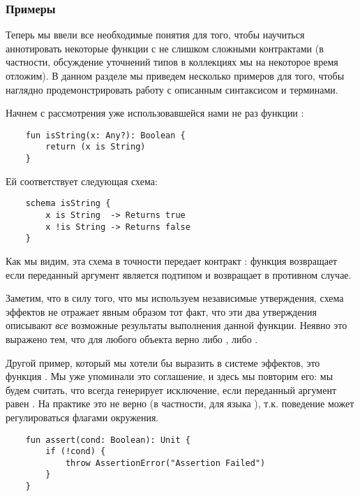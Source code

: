 \subsubsection{Примеры}

Теперь мы ввели все необходимые понятия для того, чтобы научиться аннотировать некоторые функции с не слишком сложными контрактами (в частности, обсуждение уточнений типов в коллекциях мы на некоторое время отложим). В данном разделе мы приведем несколько примеров для того, чтобы наглядно продемонстрировать работу с описанным синтаксисом и терминами.

Начнем с рассмотрения уже использовавшейся нами не раз функции :

\begin{verbatim}
    fun isString(x: Any?): Boolean {
        return (x is String)
    }
\end{verbatim}

Ей соответствует следующая схема:

\begin{verbatim}
    schema isString {
        x is String  -> Returns true
        x !is String -> Returns false
    }
\end{verbatim}

Как мы видим, эта схема в точности передает контракт : функция возвращает  если переданный аргумент является подтипом  и возвращает  в противном случае. 

Заметим, что в силу того, что мы используем независимые утверждения, схема эффектов не отражает явным образом тот факт, что эти два утверждения описывают \emph{все} возможные результаты выполнения данной функции. Неявно это выражено тем, что для любого объекта  верно либо , либо . 


\bigskip


Другой пример, который мы хотели бы выразить в системе эффектов, это функция . Мы уже упоминали это соглашение, и здесь мы повторим его: мы будем считать, что  всегда генерирует исключение, если переданный аргумент равен . На практике это не верно (в частности, для языка ), т.к. поведение  может регулироваться флагами окружения. 

\begin{verbatim}
    fun assert(cond: Boolean): Unit {
        if (!cond) {
            throw AssertionError("Assertion Failed")
        }
    }
\end{verbatim}

